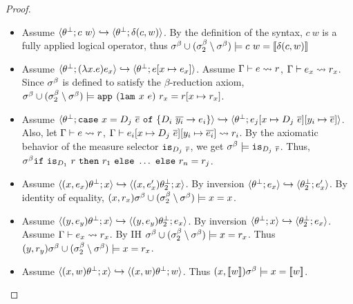 \begin{proof}
\begin{itemize}
\item 
Assume
	$\langle {\theta_{}^\perp}; c\ w\rangle
	\hookrightarrow\langle {\theta_{}^\perp}; \delta(c, w)\rangle$. 
By the definition of the syntax, $c\ w$ is a fully applied logical operator, thus
  $\sigma^\beta \cup (\sigma^\beta_2 \setminus \sigma^\beta)
    \models {c\ w} = [\![\delta(c, w)]\!]$

\item 
Assume
	$\track{\tsub{}}{(\efun{x}{}{\refa}) \refa_x}
	\hookrightarrow\track{\tsub{}}{\refa\subst{x}{\refa_x}}$. 
Assume
  $ \Gamma\vdash e \rightsquigarrow r $,	
  $ \Gamma\vdash e_x \rightsquigarrow r_x $. 
Since $\sigma^\beta$ is defined to satisfy the $\beta$-reduction axiom, 
  $\bmodel \cup (\bmodel_2 \setminus \bmodel)
    \models \smapp{(\smlam{x}{\refa})}{\pred_x} =\pred\subst{x}{\pred_x}$. 
  
\item 
Assume
	$\track{\tsub{}}{\ecase{x}{D_j\ \overline{e}}{\dc_i}{\overline{y_i}}{e_i}}
	\hookrightarrow\track{\tsub{}}{e_j\subst{x}{D_j\ \overline{e}}\subst{y_i}{\overline{e}}}$. 
Also, let 
  $ \Gamma\vdash e \rightsquigarrow r $,	
  $\tologicshort{\Gamma}{\refa_i\subst{x}{D_j\ \overline{\refa}}\subst{y_i}{\overline{\refa_i}}}{}{\pred_i}{}{}{}$.
By the axiomatic behavior of the measure selector $\texttt{is}_{D_j\ \overline{r}}$, we get 
  $\bmodel\models \checkdc{\dc_j\ \overline{\pred}}$.
Thus, 
  $\bmodel
	 {\eif{\checkdc{\dc_1}\ \pred}{\pred_1}{\ldots} \ \mathtt{else}\ \pred_n}
	= \pred_j
  $.


\item 
Assume
	$\langle (x, e_x){\theta_{}^\perp}; x\rangle
	\hookrightarrow
	\langle (x, e_x'){\theta_{2}^\perp}; x\rangle$.
By inversion
	$\langle {\theta_{}^\perp}; e_x\rangle
	\hookrightarrow
	\langle {\theta_{2}^\perp}; e_x'\rangle$.
By identity of equality, 
  $(x, r_x)\sigma^\beta \cup (\sigma^\beta_2 \setminus \sigma^\beta)
    \models x = x$. 

\item 
Assume
	$\langle (y, e_y){\theta_{}^\perp}; x\rangle
	\hookrightarrow
	\langle (y, e_y){\theta_{2}^\perp}; e_x\rangle$.
By inversion
	$\langle {\theta_{}^\perp}; x\rangle
	\hookrightarrow
	\langle {\theta_{2}^\perp}; e_x\rangle$.
Assume 
  $ \Gamma\vdash e_x \rightsquigarrow r_x $.
By IH
  $\sigma^\beta \cup (\sigma^\beta_2 \setminus \sigma^\beta)
    \models x = r_x$. 
Thus  
  $(y,r_y)\sigma^\beta \cup (\sigma^\beta_2 \setminus \sigma^\beta)
    \models x = r_x$. 

\item 
Assume
	$\langle (x, w){\theta_{}^\perp}; x\rangle
	\hookrightarrow
	\langle (x, w){\theta_{}^\perp}; w\rangle$.
Thus  
  $(x,[\![w]\!])\sigma^\beta 
    \models x = [\![w]\!]$. 


\end{itemize}
\end{proof}

